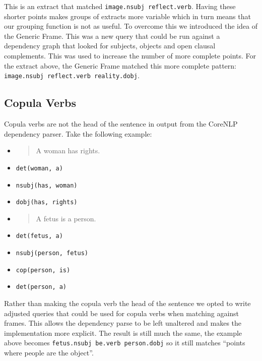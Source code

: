       This is an extract that matched \texttt{image.nsubj reflect.verb}. Having these shorter points makes groups of extracts more variable which in turn means that our grouping function is not as useful. To overcome this we introduced the idea of the Generic Frame. This was a new query that could be run against a dependency graph that looked for subjects, objects and open clausal complements. This was used to increase the number of more complete points. For the extract above, the Generic Frame matched this more complete pattern: \texttt{image.nsubj reflect.verb reality.dobj}.

    \subsection{Copula Verbs}
      Copula verbs are not the head of the sentence in output from the CoreNLP dependency parser. Take the following example:
      \begin{multicols}{2}
        \raggedcolumns
        \begin{itemize}[label={}]
          \item{\blockquote{A woman has rights.}}
          \item{\texttt{det(woman, a)}}
          \item{\texttt{nsubj(has, woman)}}
          \item{\texttt{dobj(has, rights)}}
        \end{itemize}
        \columnbreak
        \begin{itemize}[label={}]
          \item{\blockquote{A fetus is a person.}}
          \item{\texttt{det(fetus, a)}}
          \item{\texttt{nsubj(person, fetus)}}
          \item{\texttt{cop(person, is)}}
          \item{\texttt{det(person, a)}}
        \end{itemize}
      \end{multicols}

      Rather than making the copula verb the head of the sentence we opted to write adjusted queries that could be used for copula verbs when matching against frames. This allows the dependency parse to be left unaltered and makes the implementation more explicit. The result is still much the same, the example above becomes \texttt{fetus.nsubj be.verb person.dobj} so it still matches ``points where people are the object''.

